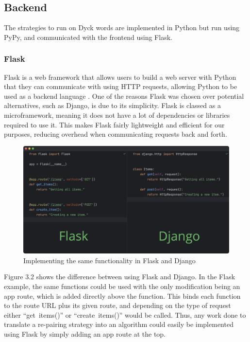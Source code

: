 \subsection{Backend}
The strategies to run on Dyck words are implemented in Python but run using PyPy, and communicated with the frontend using Flask.

\subsubsection{Flask}
Flask is a web framework that allows users to build a web server with Python that they can communicate with using HTTP requests, allowing Python to be used as a backend language \cite{whatisFlask}. One of the reasons Flask was chosen over potential alternatives, such as Django, is due to its simplicity. Flask is classed as a microframework, meaning it does not have a lot of dependencies or libraries required to use it. This makes Flask fairly lightweight and efficient for our purposes, reducing overhead when communicating requests back and forth. 

\begin{figure}[h]
    \centering
    \includegraphics[scale=0.3]{./images/flaskVSdjango.png}
    \caption{Implementing the same functionality in Flask and Django \cite{flaskVSdjango}}
\end{figure}

Figure 3.2 shows the difference between using Flask and Django. In the Flask example, the same functions could be used with the only modification being an app route, which is added directly above the function. This binds each function to the route URL plus its given route, and depending on the type of request either ``get\textunderscore~items()'' or ``create\textunderscore~items()'' would be called. Thus, any work done to translate a re-pairing strategy into an algorithm could easily be implemented using Flask by simply adding an app route at the top.


